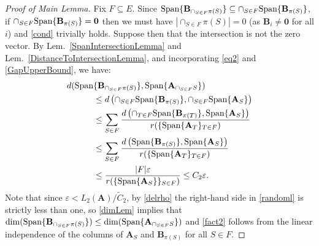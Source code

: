 \documentclass[9pt,twocolumn]{pnas-new}
\begin{document}
\begin{proof}[Proof of Main Lemma]
Fix $F \subseteq E$. Since $\text{\rm Span}\{\mathbf{B}_{\cap_{S \in F}\pi(S)}\} \subseteq \cap_{S \in F} \text{\rm Span}\{\mathbf{B}_{\pi(S)}\}$, if $\cap_{S \in F} \text{\rm Span}\{\mathbf{B}_{\pi(S)}\} = \textbf{0}$ then we must have $|\cap_{S \in F} \pi(S)| = 0$ (as $\mathbf{B}_i \neq \textbf{0}$ for all $i$) and \eqref{cond} trivially holds. Suppose then that the intersection is not the zero vector. By Lem.~\ref{SpanIntersectionLemma} and Lem.~\ref{DistanceToIntersectionLemma}, and incorporating \eqref{eq2} and \eqref{GapUpperBound}, we have:
\begin{align}\label{randoml}
d( \text{\rm Span}&\{\mathbf{B}_{\cap_{S \in F}\pi(S)}\}, \text{\rm Span}\{\mathbf{A}_{\cap_{S \in F} S}\}  ) \nonumber \\
&\leq d\left( \cap_{S \in F} \text{\rm Span}\{\mathbf{B}_{\pi(S)}\}, \cap_{S \in F} \text{\rm Span}\{\mathbf{A}_{S}\} \right) \nonumber \\
&\leq \sum_{S \in F} \frac{ d\left( \cap_{T \in F} \text{\rm Span}\{\mathbf{B}_{\pi(T)}\},\text{\rm Span}\{\mathbf{A}_{S}\} \right) }{ r( \{ \text{\rm Span}\{\mathbf{A}_{T}\}_{T \in F}) } \nonumber \\
&\leq \sum_{S \in F} \frac{ d\left( \text{\rm Span}\{\mathbf{B}_{\pi(S)}\},\text{\rm Span}\{\mathbf{A}_{S}\} \right) }{ r( \{ \text{\rm Span}\{\mathbf{A}_{T}\}_{T \in F}) }\nonumber \\
&\leq \frac{|F| \varepsilon}{r( \{ \text{\rm Span}\{\mathbf{A}_{S}\} \}_{S \in F})} 
\leq C_2 \varepsilon. 
\end{align}
%
Note that since $\varepsilon < L_2(\mathbf{A}) / \tilde C_2$, by \eqref{delrho} the right-hand side in \eqref{randoml} is strictly less than one, so \eqref{dimLem} implies that $\dim(\text{\rm Span}\{\mathbf{B}_{\cap_{S \in F}\pi(S)}\}) \leq \dim(\text{\rm Span}\{\mathbf{A}_{\cap_{S \in F} S}\})$ and \eqref{fact2} follows from the linear independence of the columns of $\mathbf{A}_{S}$ and $\mathbf{B}_{\pi(S)}$ for all $S \in F$.


\end{proof}
\end{document}
